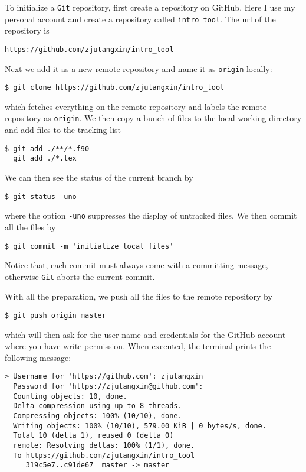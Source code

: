 \documentclass[twoside,11pt,leqno]{article}
\newcommand{\code}{\texttt}
\begin{document}
To initialize a \code{Git} repository, first create a repository on GitHub. Here I use my personal account and create a repository called \code{intro\_tool}. The url of the repository is
{\color{blue}\begin{verbatim}
https://github.com/zjutangxin/intro_tool
\end{verbatim}}
\noindent Next we add it as a new remote repository and name it as \code{origin} locally:
\begin{verbatim}
$ git clone https://github.com/zjutangxin/intro_tool
\end{verbatim}
which fetches everything on the remote repository and labels the remote repository as \code{origin}. We then copy a bunch of files to the local working directory and add files to the tracking list
\begin{verbatim}
$ git add ./**/*.f90
  git add ./*.tex
\end{verbatim}
We can then see the status of the current branch by
\begin{verbatim}
$ git status -uno
\end{verbatim}
where the option \code{-uno} suppresses the display of untracked files. We then commit all the files by
\begin{verbatim}
$ git commit -m 'initialize local files'
\end{verbatim}
Notice that, each commit must always come with a committing message, otherwise \code{Git} aborts the current commit.

With all the preparation, we push all the files to the remote repository by
\begin{verbatim}
$ git push origin master
\end{verbatim}
which will then ask for the user name and credentials for the GitHub account where you have write permission. When executed, the terminal prints the following message:
\begin{verbatim}
> Username for 'https://github.com': zjutangxin
  Password for 'https://zjutangxin@github.com':
  Counting objects: 10, done.
  Delta compression using up to 8 threads.
  Compressing objects: 100% (10/10), done.
  Writing objects: 100% (10/10), 579.00 KiB | 0 bytes/s, done.
  Total 10 (delta 1), reused 0 (delta 0)
  remote: Resolving deltas: 100% (1/1), done.
  To https://github.com/zjutangxin/intro_tool
     319c5e7..c91de67  master -> master
\end{verbatim}
\end{document}
